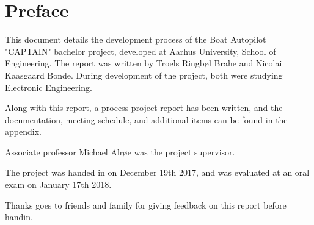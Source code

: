 \chapter{Preface}
This document details the development process of the Boat Autopilot "CAPTAIN" bachelor project, developed at Aarhus University, School of Engineering. The report was written by Troels Ringbøl Brahe and Nicolai Kaasgaard Bonde. During development of the project, both were studying Electronic Engineering.

Along with this report, a process project report has been written, and the documentation, meeting schedule, and additional items can be found in the appendix.

Associate professor Michael Alrøe was the project supervisor.

The project was handed in on December 19th 2017, and was evaluated at an oral exam on January 17th 2018.

Thanks goes to friends and family for giving feedback on this report before handin.